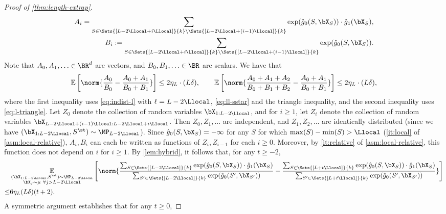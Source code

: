 \documentclass{article}
\begin{document}
\begin{proof}[Proof of \cref{thm:length-extrap}]
\begin{align}
    A_i = \sum_{S \in \Sets{[L-2\Llocal+i\Llocal]}{k}\backslash \Sets{[L-2\Llocal+(i-1)\Llocal]}{k}} \exp(\hat g_0(S, \bX_S)) \cdot \hat g_1(\bX_S), \nonumber\\
    B_i := \sum_{S \in \Sets{[L-2\Llocal+i\Llocal]}{k} \backslash \Sets{[L-2\Llocal+ (i-1)\Llocal]}{k}} \exp(\hat g_0(S, \bX_S))\nonumber.
  \end{align}
  Note that $A_0, A_1, \ldots \in \BR^d$ are vectors, and $B_0, B_1, \ldots \in \BR$ are scalars.
  We have that
  \begin{align}
\E \left[ \norm{ \frac{A_0}{B_0} - \frac{A_0 + A_1 }{B_0 + B_1} }\right] \leq 2\eta_L \cdot (L \delta), \qquad \E\left[ \norm{ \frac{A_0 + A_1 + A_2}{B_0 + B_1 + B_2} - \frac{A_0 + A_1}{B_0 + B_1} } \right] \leq 2\eta_L \cdot (L\delta)\nonumber,
  \end{align}
  where the first inequality uses \cref{eq:indist-l} with $\ell = L - 2\Llocal$, \cref{eq:ll-sstar} and the triangle inequality, and the second inequality uses \cref{eq:l-triangle}. %
  Let $Z_0$ denote the collection of random variables $\bX_{1:L-2\Llocal}$, and for $i \geq 1$, let $Z_i$ denote the collection of random variables $\bX_{L-2\Llocal + (i-1)\Llocal : L-2\Llocal + i\Llocal}$. Then $Z_0, Z_1, \ldots$ are independent, and $Z_1, Z_2, \ldots$ are identically distributed (since we have $(\bX_{1:L-2\Llocal}, S^\st) \sim \MP_{L-2\Llocal}$).  Since $\hat g_0(S, \bX_S) = -\infty$ for any $S$ for which $\max(S) - \min(S) > \Llocal$ (\cref{it:local} of \cref{asm:local-relative}), $A_i, B_i$ can each be written as functions of $Z_i, Z_{i-1}$ for each $i \geq 0$. Moreover, by \cref{it:relative} of \cref{asm:local-relative}, this function does not depend on $i$ for $i \geq 1$. By \cref{lem:hybrid}, it follows that, for any $t \geq -2$, 
  {\small\begin{align}
          &  \E_{\substack{(\bX_{1:L-2\Llocal}, S^\st) \sim \MP_{L-2\Llocal} \\ \bX_j \sim \mu \ \forall j > L-2\Llocal}}\left[ \norm{  \frac{\sum_{S \in \Sets{[L-2\Llocal]}{k}}\exp(\hat g_0(S, \bX_S)) \cdot \hat g_1(\bX_S)}{\sum_{S' \in \Sets{[L-2\Llocal]}{k}} \exp(\hat g_0(S', \bX_{S'}))} -  \frac{\sum_{S \in \Sets{[L+ t\Llocal]}{k}}\exp(\hat g_0(S, \bX_S)) \cdot \hat g_1(\bX_S)}{\sum_{S' \in \Sets{[L + t\Llocal]}{k}} \exp(\hat g_0(S', \bX_{S'}))}}\right] \nonumber\\
           \leq  & 6\eta_L (L \delta)  (t+2)\nonumber.
 \end{align}}
       A symmetric argument establishes that for any $t \geq 0$,

\end{proof}
\end{document}
